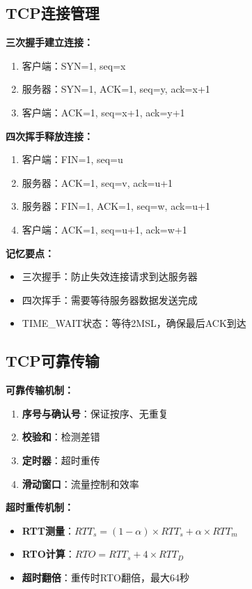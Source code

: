\documentclass[lang=cn,newtx,10pt,scheme=chinese]{../../elegantbook}
\begin{document}
\subsection{TCP连接管理}

\textbf{三次握手建立连接：}
\begin{enumerate}
  \item 客户端：SYN=1, seq=x
  \item 服务器：SYN=1, ACK=1, seq=y, ack=x+1  
  \item 客户端：ACK=1, seq=x+1, ack=y+1
\end{enumerate}

\textbf{四次挥手释放连接：}
\begin{enumerate}
  \item 客户端：FIN=1, seq=u
  \item 服务器：ACK=1, seq=v, ack=u+1
  \item 服务器：FIN=1, ACK=1, seq=w, ack=u+1
  \item 客户端：ACK=1, seq=u+1, ack=w+1
\end{enumerate}

\textbf{记忆要点：}
\begin{itemize}
  \item 三次握手：防止失效连接请求到达服务器
  \item 四次挥手：需要等待服务器数据发送完成
  \item TIME\_WAIT状态：等待2MSL，确保最后ACK到达
\end{itemize}

\subsection{TCP可靠传输}

\textbf{可靠传输机制：}
\begin{enumerate}
  \item \textbf{序号与确认号}：保证按序、无重复
  \item \textbf{校验和}：检测差错
  \item \textbf{定时器}：超时重传
  \item \textbf{滑动窗口}：流量控制和效率
\end{enumerate}

\textbf{超时重传机制：}
\begin{itemize}
  \item \textbf{RTT测量}：$RTT_s = (1-\alpha) \times RTT_s + \alpha \times RTT_m$
  \item \textbf{RTO计算}：$RTO = RTT_s + 4 \times RTT_D$
  \item \textbf{超时翻倍}：重传时RTO翻倍，最大64秒
\end{itemize}
\end{document}
